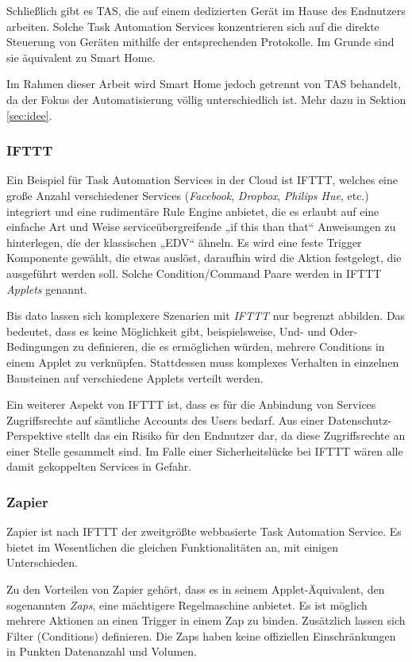 Schließlich gibt es TAS, die auf einem dedizierten Gerät im Hause des Endnutzers arbeiten. Solche Task Automation Services konzentrieren sich auf die direkte Steuerung von Geräten mithilfe der entsprechenden Protokolle. Im Grunde sind sie äquivalent zu Smart Home. 

Im Rahmen dieser Arbeit wird Smart Home jedoch getrennt von TAS behandelt, da der Fokus der Automatisierung völlig unterschiedlich ist. Mehr dazu in Sektion \ref{sec:idee}.



\subsubsection{IFTTT}
Ein Beispiel für Task Automation Services in der Cloud ist IFTTT, welches eine große Anzahl verschiedener Services (\textit{Facebook}, \textit{Dropbox}, \textit{Philips Hue}\cite{hue},   etc.) integriert und eine rudimentäre Rule Engine anbietet, die es erlaubt auf eine einfache Art und Weise serviceübergreifende „if this than that“ Anweisungen zu hinterlegen, die der klassischen „EDV“ ähneln. Es wird eine feste Trigger Komponente gewählt, die etwas auslöst, daraufhin wird die Aktion festgelegt, die ausgeführt werden soll. Solche Condition/Command Paare werden in IFTTT \textit{Applets} genannt. 

Bis dato lassen sich komplexere Szenarien mit \textit{IFTTT} nur begrenzt abbilden. Das bedeutet, dass es keine Möglichkeit gibt, beispielsweise, Und- und Oder-Bedingungen zu definieren, die es ermöglichen würden, mehrere Conditions in einem Applet zu verknüpfen. Stattdessen muss komplexes Verhalten in einzelnen Bausteinen auf verschiedene Applets verteilt werden.

Ein weiterer Aspekt von IFTTT ist, dass es für die Anbindung von Services Zugriffsrechte auf sämtliche Accounts des Users bedarf. Aus einer Datenschutz-Perspektive\cite{cloudsec} stellt das ein Risiko für den Endnutzer dar, da diese Zugriffsrechte an einer Stelle gesammelt sind. Im Falle einer Sicherheitslücke bei IFTTT wären alle damit gekoppelten Services in Gefahr. 

\subsubsection{Zapier}
Zapier ist nach IFTTT der zweitgrößte webbasierte Task Automation Service. Es bietet im Wesentlichen die gleichen Funktionalitäten an, mit einigen Unterschieden. 

Zu den Vorteilen von Zapier gehört, dass es in seinem Applet-Äquivalent, den sogenannten \textit{Zaps}, eine mächtigere Regelmaschine anbietet. Es ist möglich mehrere Aktionen an einen Trigger in einem Zap zu binden. Zusätzlich lassen sich Filter (Conditions) definieren. Die Zaps haben keine offiziellen Einschränkungen in Punkten Datenanzahl und Volumen.

